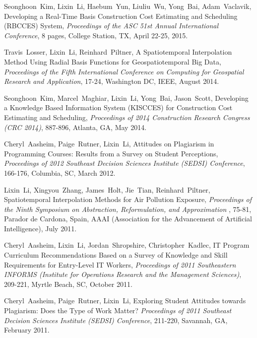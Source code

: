 \documentclass[10pt]{article}
\begin{document}
\begin{bibenum}

\item Seonghoon~Kim, Lixin~Li, Haebum~Yun, Liuliu~Wu, Yong~Bai, Adam~Vaclavik, Developing a Real-Time Basis Construction Cost Estimating and Scheduling (RBCCES) System, {\it Proceedings of the ASC 51st Annual International Conference}, 8 pages, College Station, TX, April 22-25, 2015.

\item Travis~Losser, Lixin~Li, Reinhard~Piltner, 
A Spatiotemporal Interpolation Method Using Radial Basis Functions for Geospatiotemporal Big Data, 
{\it Proceedings of the Fifth International Conference on Computing for Geospatial Research and Application}, 17-24, Washington DC, IEEE, August 2014.

\item Seonghoon~Kim, Marcel~Maghiar, Lixin~Li, Yong~Bai, Jason~Scott,
Developing a Knowledge Based Information System (KISCCES) for 
Construction Cost Estimating and Scheduling, {\it Proceedings of 2014 Construction Research Congress (CRC 2014)}, 887-896, Atlanta, GA, May 2014.

\item Cheryl~Aasheim, Paige~Rutner, Lixin~Li, Attitudes on Plagiarism in 
Programming Courses: Results from a Survey on Student Perceptions, 
{\it Proceedings of 2012 Southeast Decision Sciences Institute (SEDSI) Conference}, 
166-176, Columbia, SC, March 2012.

\item Lixin~Li, Xingyou~Zhang, James~Holt, Jie~Tian, Reinhard~Piltner, 
Spatiotemporal Interpolation Methods for Air Pollution Exposure, 
{\it Proceedings of the Ninth Symposium on Abstraction, Reformulation, and Approximation }, 
75-81, Parador de Cardona, Spain, AAAI (Association for the Advancement of Artificial Intelligence), July 2011.

\item Cheryl~Aasheim, Lixin~Li, Jordan~Shropshire, Christopher~Kadlec, 
IT Program Curriculum Recommendations Based on a Survey of Knowledge 
and Skill Requirements for Entry-Level IT Workers,  {\it Proceedings of 2011 
Southeastern INFORMS (Institute for Operations Research and the Management Sciences)}, 
209-221, Myrtle Beach, SC, October 2011.

\item Cheryl~Aasheim, Paige~Rutner, Lixin~Li, 
Exploring Student Attitudes towards Plagiarism: Does the Type of Work Matter? 
{\it Proceedings of 2011 Southeast Decision Sciences Institute (SEDSI) Conference}, 
211-220, Savannah, GA, February 2011.


\end{bibenum}
\end{document}

